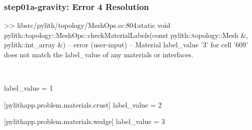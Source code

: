 \documentclass[aspectratio=169]{beamer}
\begin{document}
\begin{frame}[t,fragile]
  \frametitle{{\ttfamily step01a-gravity}: Error 4 Resolution}

  \tserror
  \begin{pyrejournal}
 >> libsrc/pylith/topology/MeshOps.cc:804:static void pylith::topology::MeshOps::checkMaterialLabels(const pylith::topology::Mesh &, pylith::int_array &)
 -- error (user-input)
 -- Material label_value '3' for cell '609' does not match the label_value of any materials or interfaces.
  \end{pyrejournal}

  \pause\\[1pt]

  \begin{cfgcode}
    label_value = 1

    [pylithapp.problem.materials.crust]
    label_value = 2

    [pylithapp.problem.materials.wedge]
    label_value = 3
  \end{cfgcode}

\end{frame}
\end{document}
